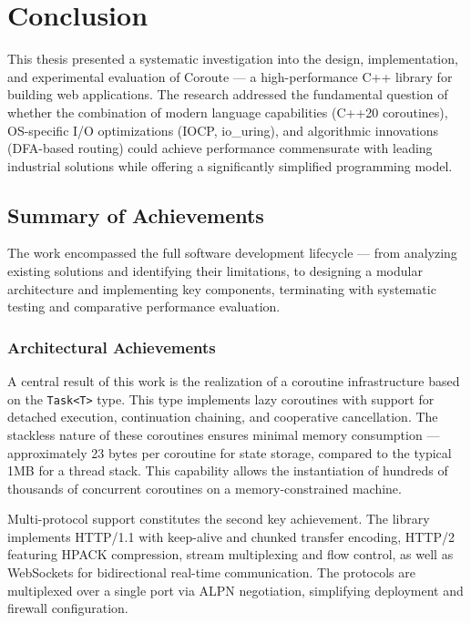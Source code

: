 \section{Conclusion}
\label{sec:conclusion}

This thesis presented a systematic investigation into the design, implementation, and experimental evaluation of Coroute --- a high-performance C++ library for building web applications. The research addressed the fundamental question of whether the combination of modern language capabilities (C++20 coroutines), OS-specific I/O optimizations (IOCP, io\_uring), and algorithmic innovations (DFA-based routing) could achieve performance commensurate with leading industrial solutions while offering a significantly simplified programming model.

\subsection{Summary of Achievements}

The work encompassed the full software development lifecycle --- from analyzing existing solutions and identifying their limitations, to designing a modular architecture and implementing key components, terminating with systematic testing and comparative performance evaluation.

\subsubsection{Architectural Achievements}

A central result of this work is the realization of a coroutine infrastructure based on the \texttt{Task<T>} type. This type implements lazy coroutines with support for detached execution, continuation chaining, and cooperative cancellation. The stackless nature of these coroutines ensures minimal memory consumption --- approximately 23 bytes per coroutine for state storage, compared to the typical 1MB for a thread stack. This capability allows the instantiation of hundreds of thousands of concurrent coroutines on a memory-constrained machine.

Multi-protocol support constitutes the second key achievement. The library implements HTTP/1.1 with keep-alive and chunked transfer encoding, HTTP/2 featuring HPACK compression, stream multiplexing and flow control, as well as WebSockets for bidirectional real-time communication. The protocols are multiplexed over a single port via ALPN negotiation, simplifying deployment and firewall configuration.

